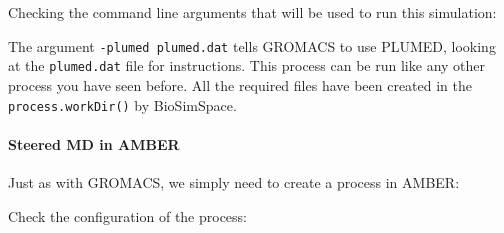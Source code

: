Checking the command line arguments that will be used to run this
simulation:

\begin{Shaded}
\begin{Highlighting}[]
\NormalTok{OrderedDict([(}\NormalTok{, }\NormalTok{), (}\NormalTok{, }\NormalTok{, }\NormalTok{)])}
\end{Highlighting}
\end{Shaded}

The argument \texttt{-plumed\ plumed.dat} tells GROMACS to use PLUMED,
looking at the \texttt{plumed.dat} file for instructions. This process
can be run like any other process you have seen before. All the required
files have been created in the \texttt{process.workDir()} by
BioSimSpace.

\hypertarget{steered-md-in-amber}{%
\paragraph{Steered MD in AMBER}\label{steered-md-in-amber}}

Just as with GROMACS, we simply need to create a process in AMBER:

\begin{Shaded}
\begin{Highlighting}[]
\OperatorTok{=}
\end{Highlighting}
\end{Shaded}

Check the configuration of the process:

\begin{Shaded}
\begin{Highlighting}[]
\NormalTok{[}\NormalTok{,}
 \NormalTok{,}
 \NormalTok{,}
 \NormalTok{,}
 \NormalTok{,}
 \NormalTok{,}
 \NormalTok{,}
 \NormalTok{,}
 \NormalTok{,}
 \NormalTok{,}
 \NormalTok{,}
 \NormalTok{,}
 \NormalTok{,}
 \NormalTok{,}
 \NormalTok{,}
 \NormalTok{,}
 \NormalTok{,}
 \NormalTok{,}
 \NormalTok{,}
 \NormalTok{,}
 \NormalTok{,}
 \NormalTok{,}
 \NormalTok{]}
\end{Highlighting}
\end{Shaded}

